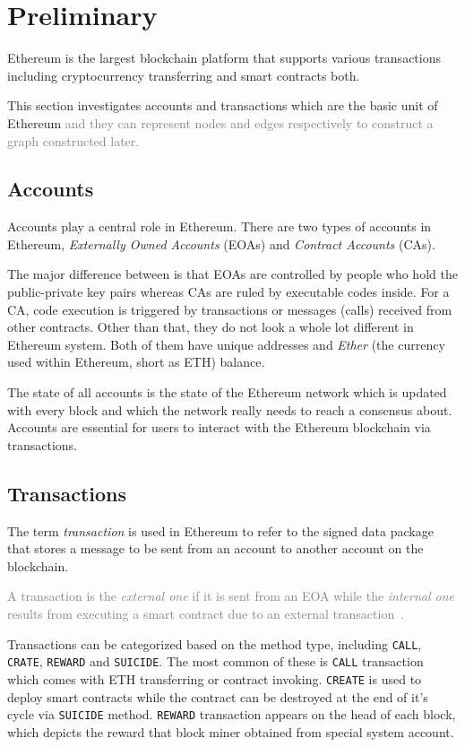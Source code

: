 
\section{Preliminary}
Ethereum is the largest blockchain platform that supports various transactions including cryptocurrency transferring and smart contracts both. 

This section investigates accounts and transactions which are the basic unit of Ethereum \textcolor{gray}{and they can represent nodes and edges respectively to construct a graph constructed later.} 

\subsection{Accounts}
Accounts play a central role in Ethereum. There are two types of accounts in Ethereum, \emph{Externally Owned Accounts} (EOAs) and \emph{Contract Accounts} (CAs). 

The major difference between is that EOAs are controlled by people who hold the public-private key pairs whereas CAs are ruled by executable codes inside. For a CA, code execution is triggered by transactions or messages (calls) received from other contracts. Other than that, they do not look a whole lot different in Ethereum system. Both of them have unique addresses and \emph{Ether} (the currency used within Ethereum, short as ETH) balance.

The state of all accounts is the state of the Ethereum network which is updated with every block and which the network really needs to reach a consensus about. Accounts are essential for users to interact with the Ethereum blockchain via transactions.
 
 \subsection{Transactions}
 The term \emph{transaction} is used in Ethereum to refer to the signed data package that stores a message to be sent from an account to another account on the blockchain.
 
\textcolor{gray}{A transaction is the \emph{external one} if it is sent from an EOA while the \emph{internal one} results from executing a smart contract due to an external transaction~\cite{chen2018infocom}.}

Transactions can be categorized based on the method type, including \texttt{CALL}, \texttt{CRATE}, \texttt{REWARD} and \texttt{SUICIDE}. The most common of these is \texttt{CALL} transaction which comes with ETH transferring or contract invoking. \texttt{CREATE} is used to deploy smart contracts while the contract can be destroyed at the end of it's cycle via \texttt{SUICIDE} method. \texttt{REWARD} transaction appears on the head of each block, which depicts the reward that block miner obtained from special system account.

